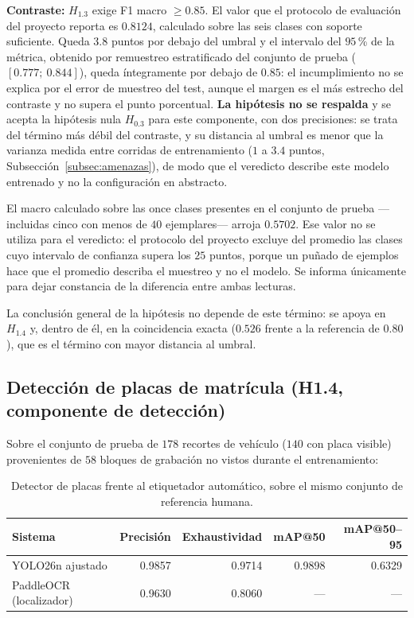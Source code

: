\textbf{Contraste:} $H_{1{.}3}$ exige F1 macro $\geq 0{.}85$. El valor que el
protocolo de evaluación del proyecto reporta es $0{.}8124$, calculado sobre las
seis clases con soporte suficiente. Queda $3{.}8$ puntos por debajo del umbral y
el intervalo del $95$\,\% de la métrica, obtenido por remuestreo estratificado del
conjunto de prueba ($[0{.}777;\ 0{.}844]$), queda íntegramente por debajo de
$0{.}85$: el incumplimiento no se explica por el error de muestreo del test,
aunque el margen es el más estrecho del contraste y no supera el punto
porcentual. \textbf{La hipótesis no se respalda} y se acepta la hipótesis nula
$H_{0{.}3}$ para este componente, con dos precisiones: se trata del término más
débil del contraste, y su distancia al umbral es menor que la varianza medida
entre corridas de entrenamiento ($1$ a $3{.}4$ puntos, Subsección~\ref{subsec:amenazas}), de modo que el
veredicto describe este modelo entrenado y no la configuración en abstracto.

El macro calculado sobre las once clases presentes en el conjunto de prueba
---incluidas cinco con menos de $40$ ejemplares--- arroja $0{.}5702$. Ese valor
no se utiliza para el veredicto: el protocolo del proyecto excluye del promedio
las clases cuyo intervalo de confianza supera los $25$ puntos, porque un puñado de
ejemplos hace que el promedio describa el muestreo y no el modelo. Se informa
únicamente para dejar constancia de la diferencia entre ambas lecturas.

La conclusión general de la hipótesis no depende de este término: se apoya en
$H_{1{.}4}$ y, dentro de él, en la coincidencia exacta ($0{.}526$ frente a la
referencia de $0{.}80$), que es el término con mayor distancia al umbral.

\subsection{Detección de placas de matrícula (H1.4, componente de detección)}
\label{sec:resultados_deteccion}

Sobre el conjunto de prueba de $178$ recortes de vehículo ($140$ con placa
visible) provenientes de $58$ bloques de grabación no vistos durante el
entrenamiento:

\begin{table}[H]
    \centering
    \caption{Detector de placas frente al etiquetador automático, sobre el mismo
    conjunto de referencia humana.}
    \begin{tabular}{lrrrr}
        \toprule
        \textbf{Sistema} & \textbf{Precisión} & \textbf{Exhaustividad} & \textbf{mAP@50} & \textbf{mAP@50--95} \\
        \midrule
        YOLO26n ajustado    & 0.9857 & 0.9714 & 0.9898 & 0.6329 \\
        PaddleOCR (localizador) & 0.9630 & 0.8060 & --- & --- \\
        \bottomrule
    \end{tabular}
\end{table}

